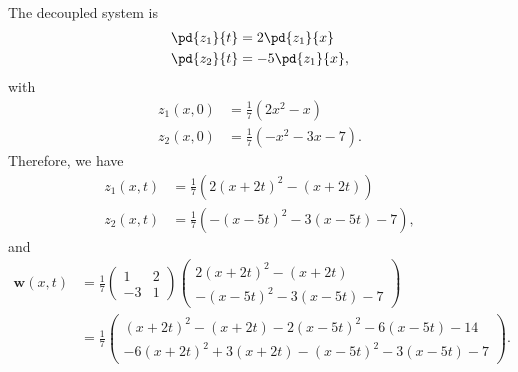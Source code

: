 \documentclass[10pt]{mypackage}
\begin{document}
\begin{solution}
\begin{align*}
  \end{align*}
  The decoupled system is
  \begin{align*}
    \pd{z_1}{t} &= 2 \pd{z_1}{x}\\
    \pd{z_2}{t} &= -5\pd{z_1}{x},
  \end{align*}
  with
  \begin{align*}
    z_1(x,0) &= \frac{1}{7}\left( 2x^2 - x \right)\\
    z_2(x,0) &= \frac{1}{7}\left( -x^2-3x-7 \right).
  \end{align*}
  Therefore, we have
  \begin{align*}
    z_1\left( x,t \right) &= \frac{1}{7}\left( 2\left( x+2t \right)^2-(x+2t) \right)\\
    z_2\left( x,t \right) &= \frac{1}{7}\left( -\left( x-5t \right)^2-3\left( x-5t \right)-7 \right),
  \end{align*}
  and
  \begin{align*}
    \mathbf{w}\left( x,t \right) &= \frac{1}{7} \begin{pmatrix}1 & 2 \\ -3 & 1\end{pmatrix} \begin{pmatrix}2\left( x+2t \right)^2-(x+2t)\\ -\left( x-5t \right)^2-3\left( x-5t \right)-7\end{pmatrix}\\
                                 &= \frac{1}{7} \begin{pmatrix}\left( x+2t \right)^2-(x+2t) - 2\left( x-5t \right)^2-6\left( x-5t \right)-14\\ -6\left( x+2t \right)^2+3\left( x+2t \right) - \left( x-5t \right)^2-3\left( x-5t \right)-7\end{pmatrix}.
  \end{align*}
  
\end{solution}
\end{document}
